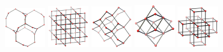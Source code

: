 \documentclass{beamer}
\begin{document}
\begin{frame}
  \begin{center}
    \includegraphics[width=0.7in]{Y-star-net}
    \hspace{1mm}
    \includegraphics[width=0.7in]{NbO-net}
    \hspace{1mm}
    \includegraphics[width=0.7in]{Diamond-net}
    \hspace{1mm}
    \includegraphics[width=0.7in]{BodyCenteredCubic-net}
    \hspace{1mm}
    \includegraphics[width=0.7in]{PrimitiveCubic-net}\\[0.5in]


\end{center}
\end{frame}
\end{document}
